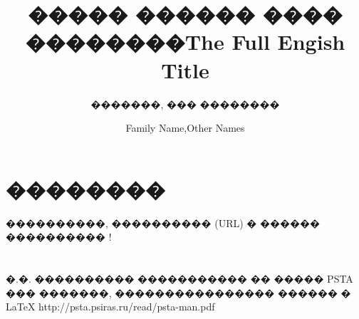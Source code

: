 \documentclass[cp1251]{psta}%
\title[������]{����� ������ ���� ��������}
\author{�������, ��� ��������}
\title[Short title]{The Full Engish Title}
\author{Family Name,Other Names}
\begin{document}
           
\maketitle   
\section*{��������}
����������, ���������� (URL) � ������ ���������� \cite{PSTAmanual}!%
\section{}
\subsection{}


% 
\begin{thebibliography}{30}
%
%
%
\by �.�. ����������
\preprint ����������� �� ����� PSTA ��� �������, ���������������� ������ � \LaTeX
{} 
\URL http://psta.psiras.ru/read/psta-man.pdf

\end{thebibliography}
\end{document}

